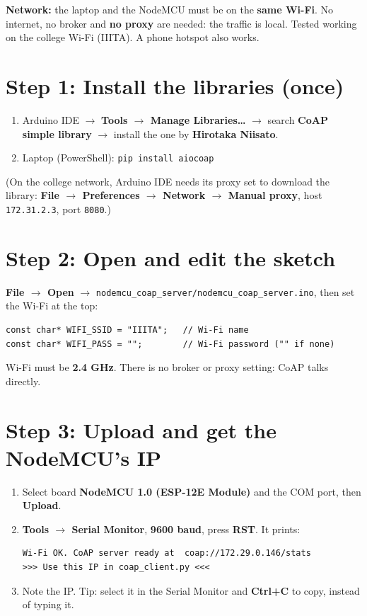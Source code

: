 \documentclass[11pt]{article}
\newcommand{\menu}[1]{\textbf{#1}}
\begin{document}
\textbf{Network:} the laptop and the NodeMCU must be on the \textbf{same Wi-Fi}. No internet, no broker and \textbf{no proxy} are needed:
the traffic is local. Tested working on the college Wi-Fi (IIITA). A phone hotspot also works.

\newpage
\section*{Step 1: Install the libraries (once)}
\begin{enumerate}
\item Arduino IDE $\rightarrow$ \menu{Tools $\rightarrow$ Manage Libraries\dots} $\rightarrow$ search \textbf{CoAP simple library} $\rightarrow$ install the one by \textbf{Hirotaka Niisato}.
\item Laptop (PowerShell): \texttt{pip install aiocoap}
\end{enumerate}
(On the college network, Arduino IDE needs its proxy set to download the library:
\menu{File $\rightarrow$ Preferences $\rightarrow$ Network $\rightarrow$ Manual proxy}, host \texttt{172.31.2.3}, port \texttt{8080}.)

\section*{Step 2: Open and edit the sketch}
\menu{File $\rightarrow$ Open} $\rightarrow$ \texttt{nodemcu\_coap\_server/nodemcu\_coap\_server.ino}, then set the Wi-Fi at the top:
\begin{verbatim}
const char* WIFI_SSID = "IIITA";   // Wi-Fi name
const char* WIFI_PASS = "";        // Wi-Fi password ("" if none)
\end{verbatim}
Wi-Fi must be \textbf{2.4 GHz}. There is no broker or proxy setting: CoAP talks directly.

\section*{Step 3: Upload and get the NodeMCU's IP}
\begin{enumerate}
\item Select board \textbf{NodeMCU 1.0 (ESP-12E Module)} and the COM port, then \menu{Upload}.
\item \menu{Tools $\rightarrow$ Serial Monitor}, \textbf{9600 baud}, press \textbf{RST}. It prints:
\begin{verbatim}
Wi-Fi OK. CoAP server ready at  coap://172.29.0.146/stats
>>> Use this IP in coap_client.py <<<
\end{verbatim}
\item Note the IP. Tip: select it in the Serial Monitor and \textbf{Ctrl+C} to copy, instead of typing it.
\end{enumerate}
\end{document}

